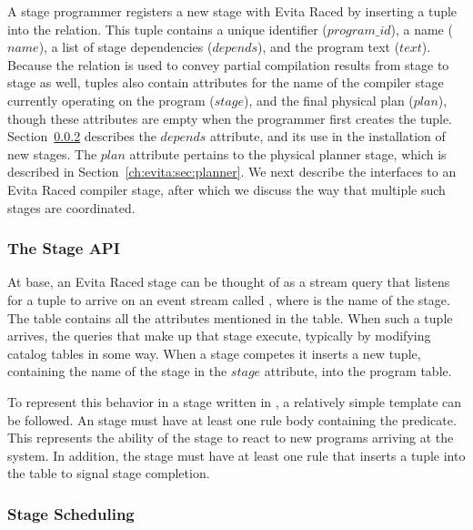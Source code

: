 A stage programmer registers a new stage with Evita Raced by inserting a tuple
into the  relation.  This tuple contains a unique identifier
($program\_id$), a name ($name$), a list of stage dependencies ($depends$), and
the program text ($text$).  Because the  relation is used to convey
partial compilation results from stage to stage as well,  tuples
also contain attributes for the name of the compiler stage currently operating
on the program ($stage$), and the final physical plan ($plan$), though these
attributes are empty when the programmer first creates the tuple.
Section~\ref{ch:evita:sec:stageschedule} describes the $depends$ attribute, and
its use in the installation of new stages.  The $plan$ attribute pertains to
the physical planner stage, which is described in
Section~\ref{ch:evita:sec:planner}.  We next describe the interfaces to an
Evita Raced compiler stage, after which we discuss the way that multiple such
stages are coordinated.

\subsubsection{The Stage API}

At base, an Evita Raced stage can be thought of as a stream query that listens
for a tuple to arrive on an event stream called ,
where  is the name of the stage.  The 
table contains all the attributes mentioned in the  table.  When
such a tuple arrives, the queries that make up that stage execute, typically by
modifying catalog tables in some way.  When a stage competes it inserts a new
 tuple, containing the name of the stage in the $stage$ attribute,
into the program table.

To represent this behavior in a stage written in \OVERLOG, a relatively simple
template can be followed.  An \OVERLOG stage must have at least one rule body
containing the  predicate.  This represents the
ability of the stage to react to new programs arriving at the system.  In
addition, the stage must have at least one rule that inserts a 
tuple into the  table to signal stage completion.

\subsubsection{Stage Scheduling}
\label{ch:evita:sec:stageschedule}

